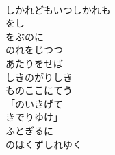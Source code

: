 \documentclass[10pt,b5j]{tarticle} %
\begin{document}
\begin{enumerate}
\begin{minipage}[c]{\blocksize}
        \vspace{\linespace}
        \item~\\
        しかれどもいつしかれも\\
        をし\\
        をぶのに\\
        のれをじつつ\\
        あたりをせば\\
        しきのがりしき\\
        ものここにてう\\
        「のいきげて\\
        きでりゆけ」\\
        ふとぎるに\\
        のはくずしれゆく
    
    \end{minipage}
\end{enumerate} %
\end{document}
